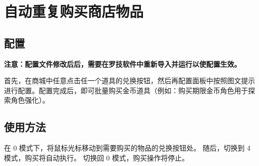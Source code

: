 \section{自动重复购买商店物品}

\subsection{配置}

\textbf{\color{red}注意：配置文件修改后后，需要在罗技软件中重新导入并运行以使配置生效。}

首先，在商城中任意点击任一个道具的兑换按钮，然后再配置面板中按照图文提示进行配置。配置完成后，即可批量购买金币道具（例如：购买期限金币角色用于探索角色强化）。

\subsection{使用方法}

在 0 模式下，将鼠标光标移动到需要购买的物品的兑换按钮处。
随后，切换到 4 模式，购买将自动执行。
切换回 0 模式，购买操作将停止。